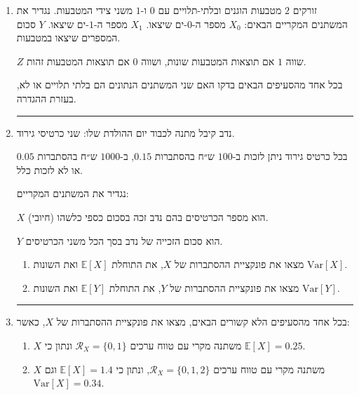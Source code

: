 \documentclass[12pt, a4paper]{article}
\newcommand{\EE}{\mathbb{E}}
\newcommand{\Var}{\mathrm{Var}}
\newcommand{\cR}{\mathcal{R}}
\newcommand{\PP}{\mathbb{P}}
\begin{document}
\begin{enumerate}
נזכיר כי
$X,Y$ מ״מ
 בלתי תלויים, אם לכל
$a,b$
 מתקיים
$.\PP(X=a, Y=b)
 =\PP(X=a)\cdot
 \PP(Y=b)$

\noindent\rule{15cm}{0.4pt}

\item
זורקים
$2$
מטבעות הוגנים ובלתי-תלויים עם 
$0$
ו-$1$
משני צידי המטבעות.
נגדיר את המשתנים המקריים הבאים:
$X_0$
מספר ה-$0$-ים שיצאו.
\quad
$X_1$
מספר ה-$1$-ים שיצאו.
\quad
$Y$
סכום המספרים שיצאו במטבעות.

$Z$
שווה
$1$
אם תוצאות המטבעות שונות,
ושווה
$0$
אם תוצאות המטבעות זהות.

בכל אחד מהסעיפים הבאים בדקו
האם 
שני המשתנים הנתונים
הם בלתי תלויים או לא, בעזרת ההגדרה.
\begin{enumerate}
\end{enumerate}

\noindent\rule{15cm}{0.4pt}

\newpage


\item
נדב קיבל מתנה לכבוד יום ההולדת שלו: שני כרטיסי גירוד.

בכל כרטיס גירוד ניתן לזכות ב-$100$
ש״ח בהסתברות
$0.15$,
ב-$1000$
ש״ח בהסתברות
$0.05$
או לא לזכות כלל.

נגדיר את המשתנים המקריים:

$X$
הוא מספר הכרטיסים בהם נדב זכה בסכום כספי כלשהו (חיובי).

$Y$
הוא סכום הזכייה של נדב בסך הכל משני הכרטיסים.

\begin{enumerate}
\item
מצאו את פונקציית ההסתברות של
$X$,
את התוחלת
$\EE[X]$
ואת השונות
$\Var[X]$.
\item
מצאו את פונקציית ההסתברות של
$Y$,
את התוחלת
$\EE[Y]$
ואת השונות
$\Var[Y]$.
\end{enumerate}

\noindent\rule{15cm}{0.4pt}

\item
בכל אחד מהסעיפים הלא קשורים הבאים, מצאו את פונקציית ההסתברות של
$X$,
 כאשר:
 \begin{enumerate}
\item
$X$
משתנה מקרי עם טווח ערכים
$\cR_X=\{0,1\}$
ונתון כי
$\EE[X]=0.25$.
\item
$X$
משתנה מקרי עם טווח ערכים
$\cR_X=\{0,1,2\}$,
ונתון כי
$\EE[X]=1.4$
וגם
$\Var[X]=0.34$.


\end{enumerate}
\end{enumerate}
\end{document}
